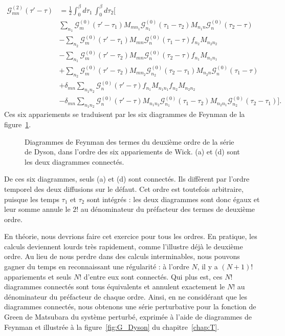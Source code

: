 \begin{align}
    \mathcal{G}^{(2)}_{mn}(\tau'-\tau) &= \frac{1}{2}\int_0^\beta d\tau_1\,\int_0^\beta d\tau_2\Big[\nonumber\\
    &\sum_{n_1}\mathcal{G}^{(0)}_m(\tau'-\tau_1)M_{mn_1}\mathcal{G}^{(0)}_{n_1}(\tau_1-\tau_2)M_{n_1n}\mathcal{G}_n^{(0)}(\tau_2-\tau)\nonumber\\
    & -\sum_{n_2}\mathcal{G}^{(0)}_m(\tau'-\tau_1)M_{mn}\mathcal{G}^{(0)}_n(\tau_1-\tau)f_{n_2}M_{n_2n_2}\nonumber\\
    &-\sum_{n_1}\mathcal{G}^{(0)}_m(\tau'-\tau_2)M_{mn}\mathcal{G}^{(0)}_n(\tau_2-\tau)f_{n_1}M_{n_1n_1}\nonumber\\
    &+\sum_{n_2}\mathcal{G}^{(0)}_m(\tau'-\tau_2)M_{mn_2}\mathcal{G}_{n_2}^{(0)}(\tau_2-\tau_1)M_{n_2n}\mathcal{G}_n^{(0)}(\tau_1-\tau)\nonumber\\
    &+\delta_{mn}\sum_{n_1n_2}\mathcal{G}_n^{(0)}(\tau'-\tau)f_{n_1}M_{n_1n_1}f_{n_2}M_{n_2n_2}\nonumber\\
    &-\delta_{mn}\sum_{n_1n_2}\mathcal{G}^{(0)}_n(\tau'-\tau)M_{n_1n_2}\mathcal{G}_{n_1}^{(0)}(\tau_1-\tau_2)M_{n_2n_1}\mathcal{G}^{(0)}_{n_2}(\tau_2-\tau_1)
    \Big].
\end{align}
Ces six appariements se traduisent par les six diagrammes de Feynman de la figure~\ref{fig:dyson_ordre2}.
\begin{figure}[htbp]
    \centering
    
    \caption[Diagrammes de Feynman des termes du deuxième ordre de la série de Dyson.]{Diagrammes de Feynman des termes du deuxième ordre de la série de Dyson, dans l'ordre des six appariements de Wick. (a) et (d) sont les deux diagrammes connectés.}
    \label{fig:dyson_ordre2}
\end{figure}

De ces six diagrammes, seuls (a) et (d) sont connectés. Ils diffèrent par l'ordre temporel des deux diffusions sur le défaut. Cet ordre est toutefois arbitraire, puisque les temps $\tau_1$ et $\tau_2$ sont intégrés : les deux diagrammes sont donc égaux et leur somme annule le $2!$ au dénominateur du préfacteur des termes de deuxième ordre.

En théorie, nous devrions faire cet exercice pour tous les ordres. En pratique, les calculs deviennent lourds très rapidement, comme l'illustre déjà le deuxième ordre. Au lieu de nous perdre dans des calculs interminables, nous pouvons gagner du temps en reconnaissant une régularité : à l'ordre $N$, il y a $(N+1)!$ appariements et seuls $N!$ d'entre eux sont connectés. Qui plus est, ces $N!$ diagrammes connectés sont tous équivalents et annulent exactement le $N!$ au dénominateur du préfacteur de chaque ordre. Ainsi, en ne considérant que les diagrammes connectés, nous obtenons une série perturbative pour la fonction de Green de Matsubara du système perturbé, exprimée à l'aide de diagrammes de Feynman et illustrée à la figure~\ref{fig:G_Dyson} du chapitre~\ref{chap:T}.

